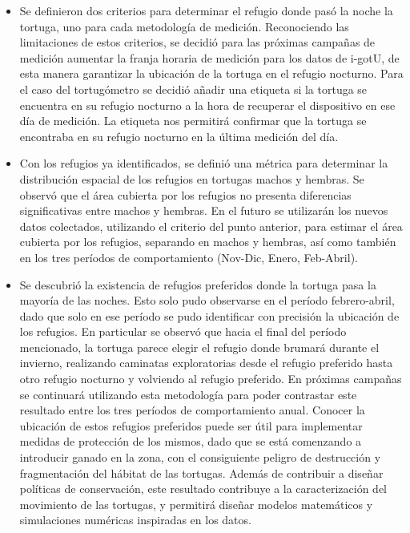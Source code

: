 \begin{itemize}
 
\item Se definieron dos criterios para determinar el refugio donde pasó la noche la tortuga, uno para cada metodología de medición. Reconociendo las limitaciones de estos criterios, se decidió para las próximas campañas de medición aumentar la franja horaria de medición para los datos de i-gotU, de esta manera garantizar la ubicación de la tortuga en el refugio nocturno. Para el caso del tortugómetro se decidió añadir una etiqueta si la tortuga se encuentra en su refugio nocturno a la hora de recuperar el dispositivo en ese día de medición. La etiqueta nos permitirá confirmar que la tortuga se encontraba en su refugio nocturno en la última medición del día.  
 
\item Con los refugios ya identificados, se definió una métrica para determinar la distribución espacial de los refugios en tortugas machos y hembras. Se observó que el área cubierta por los refugios no presenta diferencias significativas entre machos y hembras. En el futuro se utilizarán los nuevos datos colectados, utilizando el criterio del punto anterior, para estimar el área cubierta por los refugios, separando en machos y hembras, así como también en los tres períodos de comportamiento (Nov-Dic, Enero, Feb-Abril).
 
\item Se descubrió la existencia de refugios preferidos donde la tortuga pasa la mayoría de las noches. Esto solo pudo observarse en el período febrero-abril, dado que solo en ese período se pudo identificar con precisión la ubicación de los refugios. En particular se observó que hacia el final del período mencionado, la tortuga parece elegir el refugio donde brumará durante el invierno, realizando caminatas exploratorias desde el refugio preferido hasta otro refugio nocturno y volviendo al refugio preferido. En próximas campañas se continuará utilizando esta metodología para poder contrastar este resultado entre los tres períodos de comportamiento anual. Conocer la ubicación de estos refugios preferidos puede ser útil para implementar medidas de protección de los mismos, dado que se está comenzando a introducir ganado en la zona, con el consiguiente peligro de destrucción y fragmentación del hábitat de las tortugas. Además de contribuir a diseñar políticas de conservación, este resultado contribuye a la caracterización del movimiento de las tortugas, y permitirá diseñar modelos matemáticos y simulaciones numéricas inspiradas en los datos.
 

\end{itemize}
